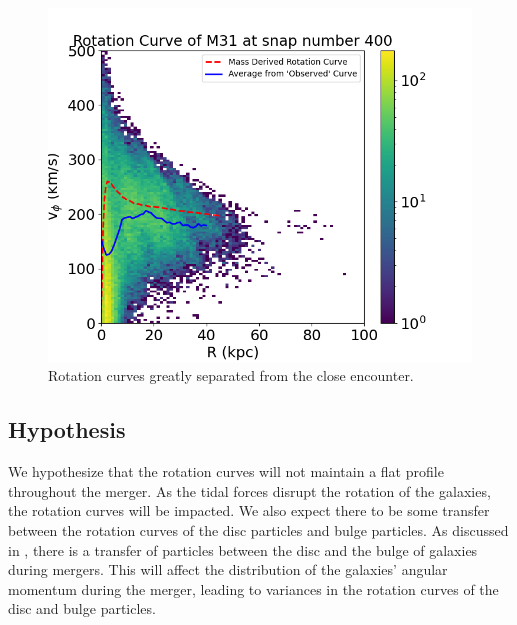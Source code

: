 \documentclass[twocolumn,linenumbers,trackchanges]{aastex7}
\begin{document}
\begin{figure}[ht!]
	\centering
	\includegraphics[width=1.0\linewidth]{M31_400_rotation_curve.png}
	\caption{Rotation curves greatly separated from the close encounter.}
\end{figure}

\subsection{Hypothesis}
We hypothesize that the rotation curves will not maintain a flat profile throughout the merger.
As the tidal forces disrupt the rotation of the galaxies, the rotation curves will be impacted.
We also expect there to be some transfer between the rotation curves of the disc particles and bulge particles.
As discussed in \cite{Kannan2015}, there is a transfer of particles between the disc and the bulge of galaxies during mergers.
This will affect the distribution of the galaxies' angular momentum during the merger, leading to variances in the rotation curves of the disc and bulge particles.

\end{document}
